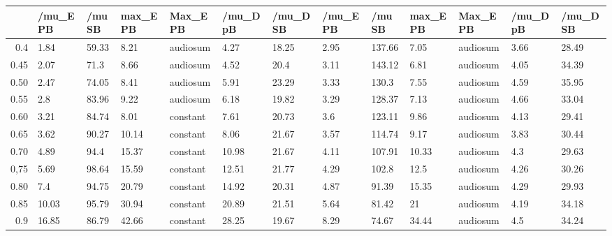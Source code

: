 \begin{table}[ht]
\centering
\begin{tabular}{rllllllllllll}
  \hline
 & /mu\_E PB & /mu SB & max\_E PB & Max\_E PB & /mu\_D pB & /mu\_D SB & /mu\_E PB & /mu SB & max\_E PB & Max\_E PB & /mu\_D pB & /mu\_D SB \\ 
  \hline
0.4 & 1.84 & 59.33 & 8.21 & audiosum & 4.27 & 18.25 & 2.95 & 137.66 & 7.05 & audiosum & 3.66 & 28.49 \\ 
  0.45 & 2.07 & 71.3 & 8.66 & audiosum & 4.52 & 20.4 & 3.11 & 143.12 & 6.81 & audiosum & 4.05 & 34.39 \\ 
  0.50 & 2.47 & 74.05 & 8.41 & audiosum & 5.91 & 23.29 & 3.33 & 130.3 & 7.55 & audiosum & 4.59 & 35.95 \\ 
  0.55 & 2.8 & 83.96 & 9.22 & audiosum & 6.18 & 19.82 & 3.29 & 128.37 & 7.13 & audiosum & 4.66 & 33.04 \\ 
  0.60 & 3.21 & 84.74 & 8.01 & constant & 7.61 & 20.73 & 3.6 & 123.11 & 9.86 & audiosum & 4.13 & 29.41 \\ 
  0.65 & 3.62 & 90.27 & 10.14 & constant & 8.06 & 21.67 & 3.57 & 114.74 & 9.17 & audiosum & 3.83 & 30.44 \\ 
  0.70 & 4.89 & 94.4 & 15.37 & constant & 10.98 & 21.67 & 4.11 & 107.91 & 10.33 & audiosum & 4.3 & 29.63 \\ 
  0,75 & 5.69 & 98.64 & 15.59 & constant & 12.51 & 21.77 & 4.29 & 102.8 & 12.5 & audiosum & 4.26 & 30.26 \\ 
  0.80 & 7.4 & 94.75 & 20.79 & constant & 14.92 & 20.31 & 4.87 & 91.39 & 15.35 & audiosum & 4.29 & 29.93 \\ 
  0.85 & 10.03 & 95.79 & 30.94 & constant & 20.89 & 21.51 & 5.64 & 81.42 & 21 & audiosum & 4.19 & 34.18 \\ 
  0.9 & 16.85 & 86.79 & 42.66 & constant & 28.25 & 19.67 & 8.29 & 74.67 & 34.44 & audiosum & 4.5 & 34.24 \\ 
   \hline
\end{tabular}
\end{table}
